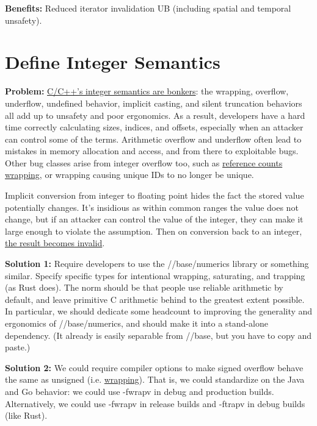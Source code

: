 \documentclass[a4paper,12pt,notitlepage,twoside,openright]{article}
\newcommand{\uline}[1]{#1}
\begin{document}
{\textbf{Benefits:} Reduced iterator invalidation UB (including spatial
and temporal unsafety).

\section{Define Integer Semantics}

\textbf{Problem:} \href{https://www.google.com/url?q=https://chromium.googlesource.com/chromium/src/\%2B/master/docs/security/integer-semantics.md\&sa=D\&source=editors\&ust=1631944129059000\&usg=AOvVaw1RJ_W19UD6mSpv0PStkjwY}{C/C++'s
integer semantics are bonkers}: the wrapping, overflow, underflow,
undefined behavior, implicit casting, and silent truncation behaviors
all add up to unsafety and poor ergonomics. As a result, developers have
a hard time correctly calculating sizes, indices, and offsets,
especially when an attacker can control some of the terms. Arithmetic
overflow and underflow often lead to mistakes in memory allocation and
access, and from there to exploitable bugs. Other bug classes arise from
integer overflow too, such
as \href{https://www.google.com/url?q=https://twitter.com/tehjh/status/1045000957678047232?lang\%3Den\&sa=D\&source=editors\&ust=1631944129060000\&usg=AOvVaw3ygs6qYV6oSRM8GtjPepzo}{\uline{reference
counts wrapping}}, or wrapping causing unique IDs to no longer be
unique.

Implicit conversion from integer to floating point hides the fact the
stored value potentially changes. It's insidious as within common ranges
the value does not change, but if an attacker can control the value of
the integer, they can make it large enough to violate the assumption.
Then on conversion back to an
integer, \href{https://www.google.com/url?q=http://crbug.com/278141\&sa=D\&source=editors\&ust=1631944129060000\&usg=AOvVaw0wnyxdxDMCXQ8kLCOWjHyU}{\uline{the
result becomes invalid}}.

\textbf{Solution 1:} Require developers to use the //base/numerics
library or something similar. Specify specific types for intentional
wrapping, saturating, and trapping (as Rust does). The norm should be
that people use reliable arithmetic by default, and leave primitive C
arithmetic behind to the greatest extent possible. In particular, we
should dedicate some headcount to improving the generality and
ergonomics of //base/numerics, and should make it into a stand-alone
dependency. (It already is easily separable from //base, but you have to
copy and paste.)

\textbf{Solution 2:} We could require compiler options to make signed
overflow behave the same as unsigned
(i.e. \href{https://www.google.com/url?q=https://clang.llvm.org/docs/ClangCommandLineReference.html\&sa=D\&source=editors\&ust=1631944129061000\&usg=AOvVaw2PGnWR5j__AwLcxq4JWAHj}{\uline{wrapping}}).
That is, we could standardize on the Java and Go behavior: we could
use -fwrapv in debug and production builds. Alternatively, we could
use -fwrapv in release builds and -ftrapv in debug builds (like Rust).

}
\end{document}
